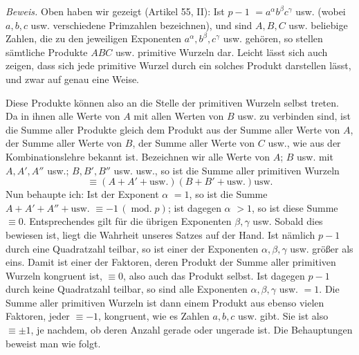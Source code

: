 \emph{Beweis.} Oben haben wir gezeigt (Artikel 55, II): Ist $p-1$ $=a^{\alpha}b^{\beta}c^{\gamma}$ usw. (wobei $a,b,c$ usw. verschiedene Primzahlen bezeichnen), und sind $A,B,C$ usw. beliebige Zahlen, die zu den jeweiligen Exponenten $a^{\alpha},b^{\beta},c^{\gamma}$ usw. gehören, so stellen sämtliche Produkte $ABC$ usw. primitive Wurzeln dar. Leicht lässt sich auch zeigen, dass sich jede primitive Wurzel durch ein solches Produkt darstellen lässt, und zwar auf genau eine Weise.

Diese Produkte können also an die Stelle der primitiven Wurzeln selbst treten. Da in ihnen alle Werte von $A$ mit allen Werten von $B$ usw. zu verbinden sind, ist die Summe aller Produkte gleich dem Produkt aus der Summe aller Werte von $A$, der Summe aller Werte von $B$, der Summe aller Werte von $C$ usw., wie aus der Kombinationslehre bekannt ist. Bezeichnen wir alle Werte von $A$; $B$ usw. mit $A,A',A''$ usw.; $B,B',B''$ usw. usw., so ist die Summe aller primitiven Wurzeln
\[\equiv(A+A'+\text{usw.})(B+B'+\text{usw.})\text{usw.}\]
Nun behaupte ich: Ist der Exponent $\alpha$ $=1$, so ist die Summe $A+A'+A''+\text{usw.}$ $\equiv-1\,(\operatorname{mod.}p)$; ist dagegen $\alpha$ $>1$, so ist diese Summe $\equiv0$. Entsprechendes gilt für die übrigen Exponenten $\beta,\gamma$ usw. Sobald dies bewiesen ist, liegt die Wahrheit unseres Satzes
auf der Hand. Ist nämlich $p-1$ durch eine Quadratzahl teilbar, so ist einer der Exponenten $\alpha,\beta,\gamma$ usw. größer als eins. Damit ist einer der Faktoren, deren Produkt der Summe aller primitiven Wurzeln kongruent ist, $\equiv0$, also auch das Produkt selbst. Ist dagegen $p-1$ durch keine Quadratzahl teilbar, so sind alle Exponenten $\alpha,\beta,\gamma$ usw. $=1$. Die Summe aller primitiven Wurzeln ist dann einem Produkt aus ebenso vielen Faktoren, jeder $\equiv-1$, kongruent, wie es Zahlen $a,b,c$ usw. gibt. Sie ist also $\equiv\pm1$, je nachdem, ob deren Anzahl gerade oder ungerade ist. Die Behauptungen beweist man wie folgt.

